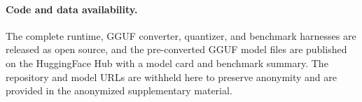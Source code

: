 \documentclass{article}
\newif\ifshowartifacts
\begin{document}
\paragraph{Code and data availability.}
\ifshowartifacts
The complete runtime, GGUF converter, quantizer, and benchmark harnesses are
open source at \url{https://github.com/AnanyaP-WDW/esmc.cpp}. The pre-converted
GGUF model files (F32/F16/Q8\_0/Q4\_K\_M/Q4\_K\_S), together with a model card
and the benchmark summary, are published at
\url{https://huggingface.co/AnanyaPathak/esmc-300m-gguf}.
\else
The complete runtime, GGUF converter, quantizer, and benchmark harnesses are
released as open source, and the pre-converted GGUF model files are published on
the HuggingFace Hub with a model card and benchmark summary. The repository and
model URLs are withheld here to preserve anonymity and are provided in the
anonymized supplementary material.
\fi
\end{document}
